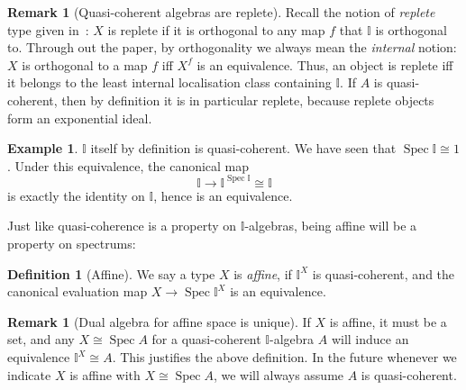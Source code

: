 \documentclass[12pt]{amsart}
\newtheorem{lemma}[theorem]{Lemma}
\theoremstyle{definition}
\newtheorem{example}[theorem]{Example}
\newtheorem{definition}[theorem]{Definition}
\newtheorem{remark}[theorem]{Remark}
\newcommand{\mbb}[1]{\mathbb{#1}}
\newcommand{\I}{\mbb I}
\newcommand{\fa}[2]{\forall #1\!\colon\!\!#2.\ }
\newcommand{\eq}{\leftrightarrow}
\newcommand{\spec}{\operatorname{Spec}}
\begin{document}


\begin{remark}[Quasi-coherent algebras are replete]\label{rem:qcreplete}
  Recall the notion of \emph{replete} type given in~\cite{hyland2006first}: $X$ is replete if it is orthogonal to any map $f$ that $\I$ is orthogonal to. Through out the paper, by orthogonality we always mean the \emph{internal} notion: $X$ is orthogonal to a map $f$ iff $X^f$ is an equivalence. Thus, an object is replete iff it belongs to the least internal localisation class containing $\I$. If $A$ is quasi-coherent, then by definition it is in particular replete, because replete objects form an exponential ideal.
\end{remark}

\begin{example}\label{exm:intervalqc}
  $\I$ itself by definition is quasi-coherent. We have seen that $\spec \I \cong 1$. Under this equivalence, the canonical map 
  \[ \I \to \I^{\spec \I} \cong \I \]
  is exactly the identity on $\I$, hence is an equivalence.
\end{example}

Just like quasi-coherence is a property on $\I$-algebras, being affine will be a property on spectrums:

\begin{definition}[Affine]
  We say a type $X$ is \emph{affine}, if $\I^X$ is quasi-coherent, and the canonical evaluation map $X \to \spec \I^X$ is an equivalence.
\end{definition}

\begin{remark}[Dual algebra for affine space is unique]
  If $X$ is affine, it must be a set, and any $X \cong \spec A$ for a quasi-coherent $\I$-algebra $A$ will induce an equivalence $\I^X \cong A$. This justifies the above definition. In the future whenever we indicate $X$ is affine with $X \cong \spec A$, we will always assume $A$ is quasi-coherent.
\end{remark}
\end{document}
